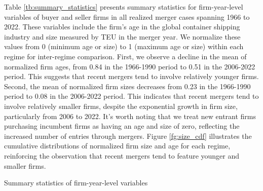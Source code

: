 \documentclass[10pt]{article}
\begin{document}
Table \ref{tb:summary_statistics} presents summary statistics for firm-year-level variables of buyer and seller firms in all realized merger cases spanning 1966 to 2022. 
These variables include the firm's age in the global container shipping industry and size measured by TEU in the merger year. 
We normalize these values from 0 (minimum age or size) to 1 (maximum age or size) within each regime for inter-regime comparison.
First, we observe a decline in the mean of normalized firm ages, from 0.84 in the 1966-1990 period to 0.51 in the 2006-2022 period. 
This suggests that recent mergers tend to involve relatively younger firms.
Second, the mean of normalized firm sizes decreases from 0.23 in the 1966-1990 period to 0.08 in the 2006-2022 period.
This indicates that recent mergers tend to involve relatively smaller firms, despite the exponential growth in firm size, particularly from 2006 to 2022.
It's worth noting that we treat new entrant firms purchasing incumbent firms as having an age and size of zero, reflecting the increased number of entries through mergers.
Figure \ref{fg:size_cdf} illustrates the cumulative distributions of normalized firm size and age for each regime, reinforcing the observation that recent mergers tend to feature younger and smaller firms.


\begin{table}[!htbp]
  \begin{center}
      \caption{Summary statistics of firm-year-level variables}
      \label{tb:summary_statistics} 
      \subfloat[CIY (1966-1990)]{}\\
      \subfloat[IHS (1991-2005)]{}\\
      \subfloat[HB (2006-2022)]{}
      
  \end{center}\footnotesize
\end{table} 
\end{document}
